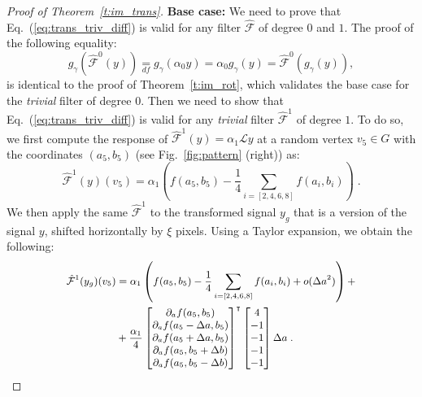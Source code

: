 \documentclass[10pt,journal,compsoc]{IEEEtran}
\newcommand{\df}{\mathop{=}\limits_{df}}
\newcommand{\hmF}{\hat{\mathcal{F}}}
\begin{document}
\begin{proof}[Proof of Theorem~\ref{t:im_trans}]
		\textbf{Base case:} We need to prove that Eq.~(\ref{eq:trans_triv_diff}) is valid for any filter $\hmF$ of degree $0$ and $1$. The proof of the following equality: 			
		\begin{equation}
		g_\gamma\left(\hmF^0 (y)\right) \df g_\gamma(\alpha_0 y) = \alpha_0 g_\gamma(y) = \hmF^0 (g_\gamma(y)),
		\label{eq:filt_diff_rot_zero_deg_shift}
		\end{equation}
		is identical to the proof of Theorem~\ref{t:im_rot}, which validates the base case for the \emph{trivial} filter of degree 0. Then we need to show that Eq.~(\ref{eq:trans_triv_diff}) is valid for any \emph{trivial} filter $\hmF^{1}$ of degree $1$. To do so, we first compute the response of $\hmF^1(y) = \alpha_1 \mathcal{L} y$ at a random vertex $v_5 \in G$ with the coordinates $(a_5,b_5)$ (see Fig.~\ref{fig:pattern} (right)) as:
		\begin{equation}
		\hmF^1(y)(v_5) = \alpha_1\left(f(a_5,b_5) - \frac{1}{4}\sum_{i=[2,4,6,8]}f(a_i,b_i)\right) \;.
		\label{eq:response_mb}
		\end{equation}
		\noindent
		We then apply the same $\hmF^1$ to the transformed signal $y_{g}$ that is a version of the signal $y$, shifted horizontally  by $\xi$ pixels. Using a Taylor expansion, we obtain the following:
		\begin{equation}
		\small
		\begin{aligned}
		\hmF^1(y_g)(v_5) & = \alpha_1\left(f(a_5,b_5) - \frac{1}{4}\sum_{i=[2,4,6,8]}f(a_i,b_i)  + o(\Delta a^2)\right) + \\
		& + \frac{\alpha_1}{4}
		\begin{bmatrix}
		\partial_a f(a_5,b_5) \\ 
		\partial_a f(a_5-\Delta a, b_5) \\ 
		\partial_a f(a_5+\Delta a, b_5) \\ 
		\partial_a f(a_5, b_5+\Delta b) \\ 
		\partial_a f(a_5, b_5-\Delta b) \\ 
		\end{bmatrix}^\intercal
		\begin{bmatrix}
		4 \\ -1 \\ -1 \\ -1 \\ -1 \\
		\end{bmatrix} \Delta a \;.
		\end{aligned}
		\label{eq:response_mafter}
		\end{equation}

\end{proof}
\end{document}
